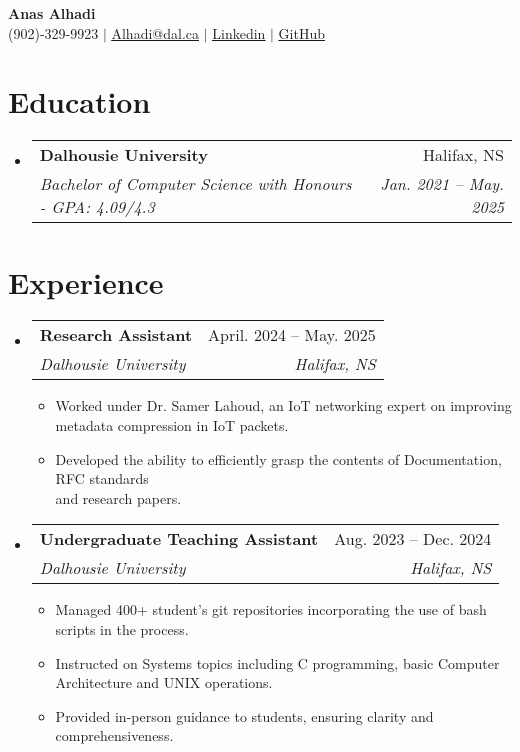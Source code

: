 \documentclass[letterpaper,11pt]{article}
\makeatletter
\newcommand{\resumeItem}[1]{
  \item\small{
    {#1 \vspace{-2pt}}
  }
}
\newcommand{\resumeSubheading}[4]{
  \vspace{-2pt}\item
    \begin{tabular*}{0.97\textwidth}[t]{l@{\extracolsep{\fill}}r}
      \textbf{#1} & #2 \\
      \textit{\small#3} & \textit{\small #4} \\
    \end{tabular*}\vspace{-7pt}
}
\newcommand{\resumeSubHeadingListStart}{\begin{itemize}[leftmargin=0.15in, label={}]}
\newcommand{\resumeSubHeadingListEnd}{\end{itemize}}
\newcommand{\resumeItemListStart}{\begin{itemize}}
\newcommand{\resumeItemListEnd}{\end{itemize}\vspace{-5pt}}
\makeatother
\begin{document}

\begin{center}
    \textbf{\Huge Anas Alhadi} \\ \vspace{1pt}
		\small (902)-329-9923 $|$ \label{contact_info}\href{mailto:Alhadi@dal.ca}{\underline{Alhadi@dal.ca}} $|$ 
    \href{https://linkedin.com/in/anas-alhadi}{\underline{Linkedin}}
$|$ 
    \href{https://github.com/pthread-me}{\underline{GitHub}}
    
\end{center}


\section{Education}
  \resumeSubHeadingListStart
    \resumeSubheading
      {Dalhousie University}{Halifax, NS}
      {Bachelor of Computer Science with Honours - GPA: 4.09/4.3}
      {Jan. 2021 -- May. 2025}
    
  \resumeSubHeadingListEnd


\section{Experience}
  \resumeSubHeadingListStart

	\resumeSubheading
      {Research Assistant}{April. 2024 -- May. 2025  }
      {Dalhousie University}{Halifax, NS}
      \resumeItemListStart
        \resumeItem{Worked under Dr. Samer Lahoud, an IoT networking expert on improving\\ metadata compression in IoT packets.}
        \resumeItem{Developed the ability to efficiently grasp the contents of Documentation, RFC standards\\ and research papers.}
      \resumeItemListEnd 


    \resumeSubheading
		{Undergraduate Teaching Assistant}{Aug. 2023 -- Dec. 2024 }
      {Dalhousie University}{Halifax, NS}
      \resumeItemListStart
        \resumeItem{Managed 400+ student's git repositories incorporating the use of bash scripts in the process.}
        \resumeItem{Instructed on Systems topics including  C programming, basic Computer Architecture and UNIX operations.}
        \resumeItem{Provided in-person guidance to students, ensuring clarity and comprehensiveness.}
      \resumeItemListEnd 
  \resumeSubHeadingListEnd
\end{document}
